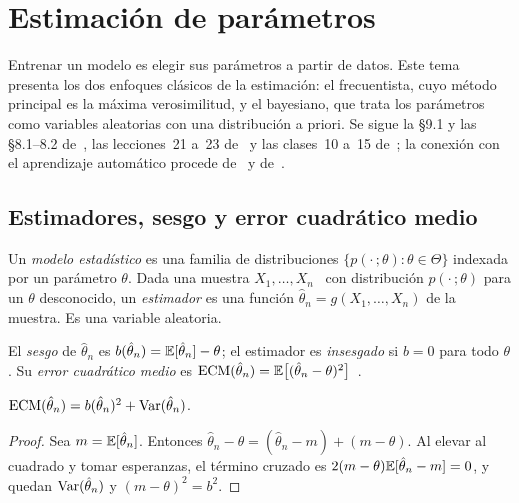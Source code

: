 \chapter{Estimación de parámetros}
\label{tema:4}

Entrenar un modelo es elegir sus parámetros a partir de datos. Este tema presenta los dos enfoques clásicos de la estimación: el frecuentista, cuyo método principal es la máxima verosimilitud, y el bayesiano, que trata los parámetros como variables aleatorias con una distribución a priori. Se sigue la §9.1 y las §8.1–8.2 de~\cite{bt}, las lecciones~21 a~23 de~\cite{mit6041} y las clases~10 a~15 de~\cite{mit1805}; la conexión con el aprendizaje automático procede de~\cite[§6.6 y §8.3]{mml} y de~\cite[§2.1–2.3]{bishop}.

\section{Estimadores, sesgo y error cuadrático medio}

\begin{definicion}
Un \emph{modelo estadístico} es una familia de distribuciones $\{p(\cdot\,;\theta):\theta\in\Theta\}$ indexada por un parámetro $\theta$. Dada una muestra $X_1,\dots,X_n$ \iid\ con distribución $p(\cdot\,;\theta)$ para un $\theta$ desconocido, un \emph{estimador} es una función $\hat\theta_n=g(X_1,\dots,X_n)$ de la muestra. Es una variable aleatoria.
\end{definicion}

\begin{definicion}
El \emph{sesgo} de $\hat\theta_n$ es $b(\hat\theta_n)=\mathbb{E}[\hat\theta_n]-\theta$; el estimador es \emph{insesgado} si $b=0$ para todo $\theta$. Su \emph{error cuadrático medio} es $\mathrm{ECM}(\hat\theta_n)=\mathbb{E}\bigl[(\hat\theta_n-\theta)^{2}\bigr]$~\cite[§9.1]{bt}.
\end{definicion}

\begin{proposicion}\label{prop:ecm}
$\mathrm{ECM}(\hat\theta_n)=b(\hat\theta_n)^{2}+\operatorname{Var}(\hat\theta_n)$.
\end{proposicion}

\begin{proof}
Sea $m=\mathbb{E}[\hat\theta_n]$. Entonces $\hat\theta_n-\theta=(\hat\theta_n-m)+(m-\theta)$. Al elevar al cuadrado y tomar esperanzas, el término cruzado es $2(m-\theta)\mathbb{E}[\hat\theta_n-m]=0$, y quedan $\operatorname{Var}(\hat\theta_n)$ y $(m-\theta)^{2}=b^{2}$.
\end{proof}

